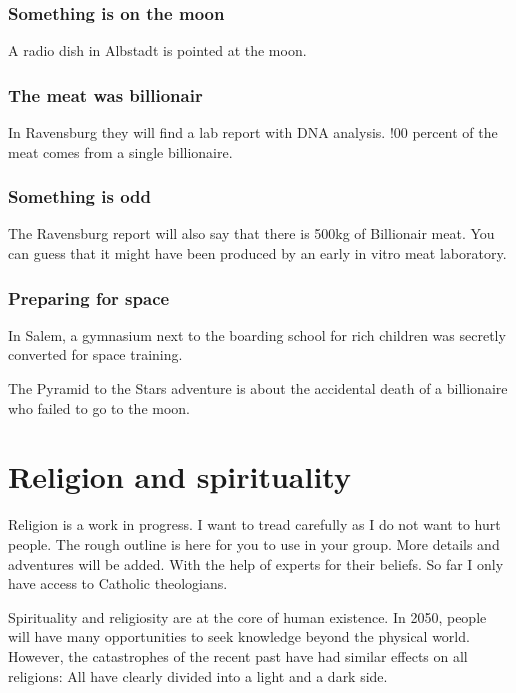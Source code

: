 \subsubsection{Something is on the moon}

A radio dish in Albstadt is pointed at the moon.

\subsubsection{The meat was billionair}

In Ravensburg they will find a lab report with DNA analysis. !00 percent of the meat comes from a single billionaire.

\subsubsection{Something is odd}

The Ravensburg report will also say that there is 500kg of Billionair meat. You can guess that it might have been produced by an early in vitro meat laboratory.

\subsubsection{Preparing for space}

In Salem, a gymnasium next to the boarding school for rich children was secretly converted for space training.

The Pyramid to the Stars adventure is about the accidental death of a billionaire who failed to go to the moon.


\section{Religion and spirituality}

\begin{warning}
    Religion is a work in progress. I want to tread carefully as I do not want to hurt people. The rough outline is here for you to use in your group. More details and adventures will be added. With the help of experts for their beliefs. So far I only have access to Catholic theologians.
\end{warning}

Spirituality and religiosity are at the core of human existence. In 2050, people will have many opportunities to seek knowledge beyond the physical world.
However, the catastrophes of the recent past have had similar effects on all religions: All have clearly divided into a light and a dark side.

